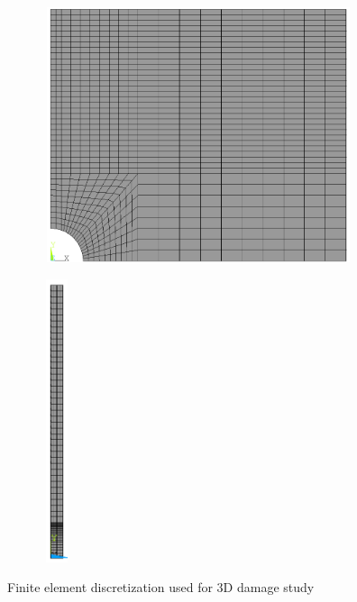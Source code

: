 \documentclass[12pt,a4paper,twoside,openright]{report}
\begin{document}
\begin{figure}[htbp!]
	\centering
       \captionsetup[subfigure]{justification=centering}
     \begin{subfigure}{0.4\textwidth}
     	\centering
         \includegraphics[width=10cm,height=7.5cm]{27.Mesh.png}
         \label{fig:plate with hole mesh 1}
     \end{subfigure}
    \hspace{2.5cm}
     \captionsetup[subfigure]{justification=centering}
     \begin{subfigure}{0.4\textwidth}
     \centering
         \includegraphics[width=0.8cm,height=8.3cm]{27.Mesh2.png}
         \label{fig:plate with hole mesh 2}
         \end{subfigure}
          \caption{Finite element discretization used for 3D damage study}
        \label{fig:plate with hole mesh} 
\end{figure}
\FloatBarrier 
\vspace*{0.3cm}
\end{document}
